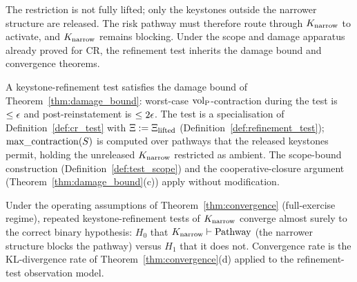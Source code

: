 The restriction is not fully lifted; only the keystones outside the
narrower structure are released.  The risk pathway must therefore
route through $K_{\mathrm{narrow}}$ to activate, and
$K_{\mathrm{narrow}}$ remains blocking.  Under the
scope and damage apparatus already proved for CR, the refinement
test inherits the damage bound and convergence theorems.

\begin{corollary}
\label{cor:refinement_damage}
A keystone-refinement test satisfies the damage bound of
Theorem~\ref{thm:damage_bound}: worst-case
${\operatorname{vol}_{\mathrm{P}}}$-contraction during the test is $\leq \epsilon$ and
post-reinstatement is $\leq 2 \epsilon$.  The test is a
specialisation of Definition~\ref{def:cr_test} with
$\Xi := \Xi_{\mathrm{lifted}}$
(Definition~\ref{def:refinement_test}); $\mathrm{max\_contraction}(S)$ is
computed over pathways that the released keystones permit,
holding the unreleased $K_{\mathrm{narrow}}$
restricted as ambient.  The scope-bound construction
(Definition~\ref{def:test_scope}) and the cooperative-closure
argument (Theorem~\ref{thm:damage_bound}(c)) apply without
modification.
\end{corollary}

\begin{corollary}
\label{cor:refinement_convergence}
Under the operating assumptions of
Theorem~\ref{thm:convergence} (full-exercise regime), repeated
keystone-refinement tests of
$K_{\mathrm{narrow}}$ converge almost surely to the
correct binary hypothesis: $H_0$ that
$K_{\mathrm{narrow}} \vdash \mathrm{Pathway}$ (the narrower
structure blocks the pathway) versus $H_1$ that it does not.
Convergence rate is the KL-divergence rate of
Theorem~\ref{thm:convergence}(d) applied to the refinement-test
observation model.
\end{corollary}

